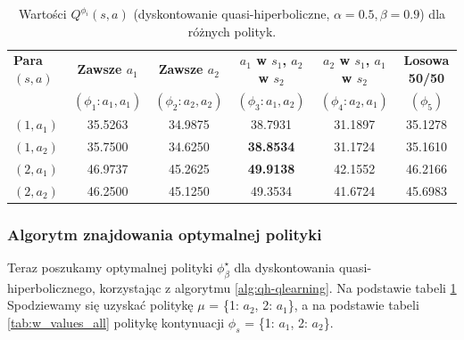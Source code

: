 \begin{table}[h!]
\centering
\caption{Wartości $Q^{\phi_i}(s,a)$ (dyskontowanie quasi-hiperboliczne, $\alpha=0.5, \beta=0.9$) dla różnych polityk.}
\label{tab:q_values_all}
\begin{tabular}{lccccc}
\toprule
	\textbf{Para} $(s,a)$ & \textbf{Zawsze $a_1$} & \textbf{Zawsze $a_2$} & \textbf{$a_1$ w $s_1$, $a_2$ w $s_2$} & \textbf{$a_2$ w $s_1$, $a_1$ w $s_2$} & \textbf{Losowa 50/50} \\
& $(\phi_1: a_1, a_1)$ & $(\phi_2: a_2, a_2)$ & $(\phi_3: a_1, a_2)$ & $(\phi_4: a_2, a_1)$ & $(\phi_5)$ \\
\midrule
$(1, a_1)$ & 35.5263 & 34.9875 & 38.7931 & 31.1897 & 35.1278 \\
$(1, a_2)$ & 35.7500 & 34.6250 & \textbf{38.8534} & 31.1724 & 35.1610 \\
\midrule
$(2, a_1)$ & 46.9737 & 45.2625 & \textbf{49.9138} & 42.1552 & 46.2166 \\
$(2, a_2)$ & 46.2500 & 45.1250 & 49.3534 & 41.6724 & 45.6983 \\
\bottomrule
\end{tabular}
\end{table}


\begin{table}[h!]
\centering
\caption{Wartości $W^{\phi_i}(s,a)$ (standardowe dyskontowanie $\beta=0.9$) dla różnych polityk.}
\label{tab:w_values_all}
\end{table}
\subsubsection{Algorytm znajdowania optymalnej polityki}
Teraz poszukamy optymalnej polityki $\phi_\beta^\star$ dla dyskontowania quasi-hiperbolicznego, korzystając z algorytmu \ref{alg:qh-qlearning}. Na podstawie tabeli \ref{tab:q_values_all} Spodziewamy się uzyskać politykę $\mu$ = \{1: $a_2$, 2: $a_1$\}, a na podstawie tabeli \ref{tab:w_values_all} politykę kontynuacji $\phi_s$ = \{1: $a_1$, 2: $a_2$\}. 

